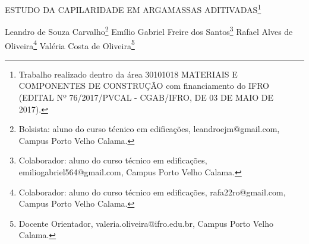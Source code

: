 \documentclass[article,12pt,onesidea,4paper,english,brazil]{abntex2}
\begin{document}
	
	
	\frenchspacing 
	
	\begin{center}
		\LARGE ESTUDO DA CAPILARIDADE EM ARGAMASSAS ADITIVADAS\footnote{Trabalho realizado dentro da área 30101018 MATERIAIS E COMPONENTES DE CONSTRUÇÃO
			com financiamento do IFRO (EDITAL Nº 76/2017/PVCAL - CGAB/IFRO, DE 03 DE MAIO DE 2017).}
		
		\normalsize
	Leandro de Souza Carvalho\footnote{Bolsista: aluno do curso técnico em edificações, leandroejm@gmail.com, Campus Porto Velho Calama.} 
	Emílio Gabriel Freire dos Santos\footnote{Colaborador: aluno do curso técnico em edificações, emiliogabriel564@gmail.com, Campus Porto Velho Calama.} 
	Rafael Alves de Oliveira\footnote{Colaborador: aluno do curso técnico em edificações, rafa22ro@gmail.com, Campus Porto Velho Calama.} 
	Valéria Costa de Oliveira\footnote{Docente Orientador, valeria.oliveira@ifro.edu.br, Campus Porto Velho Calama.} 
	\end{center}
	
\end{document}
